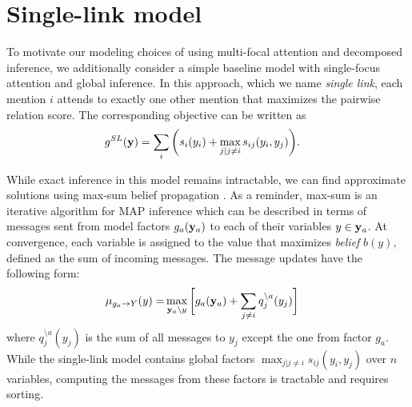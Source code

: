 


\section{Single-link model}

To motivate our modeling choices of using multi-focal attention and decomposed inference, we additionally consider a simple baseline model with single-focus attention and global inference. In this approach, which we name \emph{single link}, each mention $i$ attends to exactly one other mention that maximizes the pairwise relation score. The corresponding objective can be written as
\begin{align}
g^{SL}({\bf y}) &= \sum_i \bigg( s_i(y_i) + \max_{ j | j \neq i} s_{ij}(y_i, y_j) \bigg).
\end{align}

While exact inference in this model remains intractable, we can find approximate solutions using max-sum belief propagation \cite{Kschischang2001}. 
As a reminder, max-sum is an iterative algorithm for MAP inference which can be described in terms of messages sent from model factors $g_a({\bf y}_a)$ to each of their variables $y \in {\bf y}_a$. At convergence, each variable is assigned to the value that maximizes \emph{belief} $b(y)$, defined as the sum of incoming messages. The message updates have the following form:
\begin{align}
\mu_{g_a \rightarrow Y}(y) =& \max_{ {\bf y}_a \setminus y } \bigg[ g_a({\bf y}_a) + \sum_{j \neq i} q_j^{\setminus a}(y_j)\bigg]
\label{eq:damping}
\end{align}
\noindent where $q_j^{\setminus a}(y_j)$ is the sum of all messages to $y_j$ except the one from factor $g_a$. 
While the single-link model contains global factors $\max_{ j | j \neq i} s_{ij}(y_i, y_j)$ over $n$ variables, computing the messages from these factors is tractable and requires sorting.